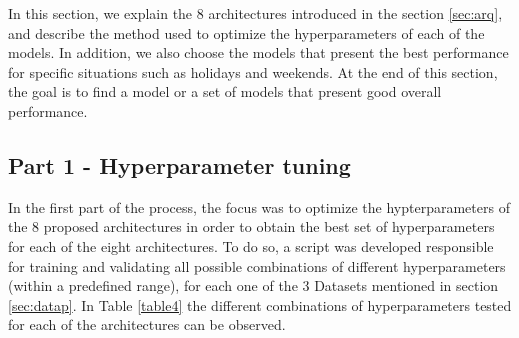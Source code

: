 In this section, we explain the 8 architectures introduced in the section \ref{sec:arq}, and describe the method used to optimize the hyperparameters of each of the models. In addition, we also choose the models that present the best performance for specific situations such as holidays and weekends. At the end of this section, the goal is to find a model or a set of models that present good overall performance.


\subsection{Part 1 - Hyperparameter tuning}\label{sec:part1}
In the first part of the process, the focus was to optimize the hypterparameters of the 8 proposed architectures in order to obtain the best set of hyperparameters for each of the eight architectures. To do so, a script was developed responsible for training and validating all possible combinations of different hyperparameters (within a predefined range), for each one of the 3 Datasets mentioned in section \ref{sec:datap}. In Table \ref{table4} the different combinations of hyperparameters tested for each of the architectures can be observed.

